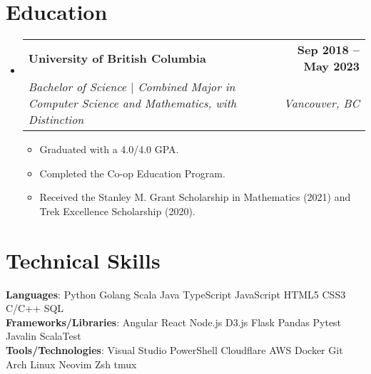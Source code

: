 \documentclass[letterpaper,11pt]{article}
\makeatletter
\newcommand{\resumeItem}[1]{
  \item\small{
    {#1 \vspace{-2pt}}
  }
}
\newcommand{\resumeSubheading}[4]{
  \vspace{-2pt}\item
    \begin{tabular*}{1.0\textwidth}[t]{l@{\extracolsep{\fill}}r}
      \textbf{#1} & \textbf{\small #2} \\
      \textit{\small#3} & \textit{\small #4} \\
    \end{tabular*}\vspace{-7pt}
}
\newcommand{\resumeSubHeadingListStart}{\begin{itemize}[leftmargin=0.0in, label={}]}
\newcommand{\resumeSubHeadingListEnd}{\end{itemize}}
\newcommand{\resumeItemListStart}{\begin{itemize}}
\newcommand{\resumeItemListEnd}{\end{itemize}\vspace{-5pt}}
\makeatother
\begin{document}
\section{Education}
  \resumeSubHeadingListStart
    \resumeSubheading
      {University of British Columbia}{Sep 2018 -- May 2023}
      {Bachelor of Science $|$ Combined Major in Computer Science and Mathematics, with Distinction}{Vancouver, BC}
      \resumeItemListStart
        \resumeItem{Graduated with a 4.0/4.0 GPA.}
        \resumeItem{Completed the Co-op Education Program.}
        \resumeItem{Received the Stanley M. Grant Scholarship in Mathematics (2021) and Trek Excellence Scholarship (2020).}
      \resumeItemListEnd
  \resumeSubHeadingListEnd
 \vspace{-16pt}

\section{Technical Skills}
 \begin{itemize}[leftmargin=0.15in, label={}]
    \small{\item{
     \textbf{Languages}{: Python \textperiodcentered{} Golang \textperiodcentered{} Scala \textperiodcentered{} Java \textperiodcentered{} TypeScript \textperiodcentered{} JavaScript \textperiodcentered{} HTML5 \textperiodcentered{} CSS3 \textperiodcentered{} C/C++ \textperiodcentered{} SQL} \\
     \textbf{Frameworks/Libraries}{: Angular \textperiodcentered{} React \textperiodcentered{} Node.js \textperiodcentered{} D3.js \textperiodcentered{} Flask \textperiodcentered{} Pandas \textperiodcentered{} Pytest \textperiodcentered{} Javalin \textperiodcentered{} ScalaTest} \\
     \textbf{Tools/Technologies}{: Visual Studio \textperiodcentered{} PowerShell \textperiodcentered{} Cloudflare \textperiodcentered{} AWS \textperiodcentered{} Docker \textperiodcentered{} Git \textperiodcentered{} Arch Linux \textperiodcentered{} Neovim \textperiodcentered{} Zsh \textperiodcentered{} tmux} \\
    }}
 \end{itemize}
\end{document}
